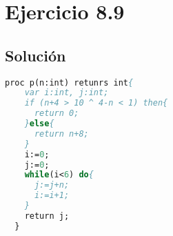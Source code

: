 \documentclass[11pt, a4paper, titlepage]{article}
\begin{document}


\section*{Ejercicio 8.9}
\subsection*{Solución}
\begin{lstlisting}[language=pascal]
  proc p(n:int) retunrs int{
    var i:int, j:int;
    if (n+4 > 10 ^ 4-n < 1) then{
      return 0;
    }else{
      return n+8;
    }
    i:=0;
    j:=0;
    while(i<6) do{
      j:=j+n;
      i:=i+1;
    }
    return j;
  }
\end{lstlisting}
\end{document}
